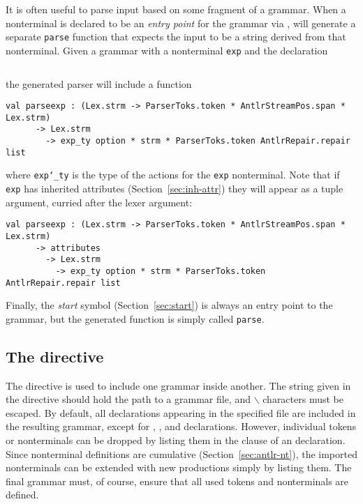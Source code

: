 It is often useful to parse input based on some fragment of a grammar.  When a nonterminal is declared to be an \emph{entry point} for the grammar via , \antlr{} will generate a separate \texttt{parse} function that expects the input to be a string derived from that nonterminal.  Given a grammar with a nonterminal \texttt{exp} and the declaration
\begin{lstlisting}[language=MLAntlr]
    %entry exp;
\end{lstlisting}%
the generated parser will include a function
\begin{lstlisting}
val parseexp : (Lex.strm -> ParserToks.token * AntlrStreamPos.span * Lex.strm)
      -> Lex.strm
        -> exp_ty option * strm * ParserToks.token AntlrRepair.repair list
\end{lstlisting}
where \texttt{exp\char`\_ty} is the type of the actions for the \texttt{exp} nonterminal.  Note that if \texttt{exp} has inherited attributes (Section~\ref{sec:inh-attr}) they will appear as a tuple argument, curried after the lexer argument:
\begin{lstlisting}
val parseexp : (Lex.strm -> ParserToks.token * AntlrStreamPos.span * Lex.strm)
      -> attributes
        -> Lex.strm
          -> exp_ty option * strm * ParserToks.token AntlrRepair.repair list
\end{lstlisting}
Finally, the \emph{start} symbol (Section~\ref{sec:start}) is always an entry point to the grammar, but the generated function is simply called \texttt{parse}.

\subsection{The  directive}

The  directive is used to include one grammar inside another.  The string given in the directive should hold the path to a grammar file, and $\backslash$ characters must be escaped.  By default, all declarations appearing in the specified file are included in the resulting grammar, except for , , and  declarations.  However, individual tokens or nonterminals can be dropped by listing them in the  clause of an  declaration.  Since nonterminal definitions are cumulative (Section~\ref{sec:antlr-nt}), the imported nonterminals can be extended with new productions simply by listing them.
The final grammar must, of course, ensure that all used tokens and nonterminals are defined.

